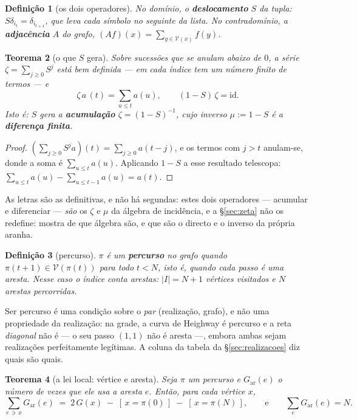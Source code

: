 \documentclass[11pt,a4paper]{article}
\newcommand{\abs}[1]{\lvert #1\rvert}
\newtheorem{teorema}{Teorema}
\newtheorem{definicao}[teorema]{Definição}
\begin{document}
\begin{definicao}[os dois operadores]\label{def:ops}
No domínio, o \textbf{deslocamento} $S$ da tupla: $S\delta_{i_t}=\delta_{i_{t+1}}$,
que leva cada símbolo no seguinte da lista. No contradomínio, a
\textbf{adjacência} $A$ do grafo, $(Af)(x)=\sum_{y\in \mathcal{V}(x)}f(y)$.
\end{definicao}

\begin{teorema}[o que $S$ gera]\label{thm:shift}
Sobre sucessões que se anulam abaixo de $0$, a série
$\zeta=\sum_{j\ge0}S^{j}$ está bem definida --- em cada índice tem um número
finito de termos --- e
\[
\zeta\,a\,(t)=\sum_{u\le t}a(u),\qquad (1-S)\,\zeta=\mathrm{id}.
\]
Isto é: $S$ gera a \textbf{acumulação} $\zeta=(1-S)^{-1}$, cujo inverso
$\mu:=1-S$ é a \textbf{diferença finita}.
\end{teorema}

\begin{proof}
$(\sum_{j\ge0}S^j a)(t)=\sum_{j\ge0}a(t-j)$, e os termos com $j>t$ anulam-se,
donde a soma é $\sum_{u\le t}a(u)$. Aplicando $1-S$ a esse resultado telescopa:
$\sum_{u\le t}a(u)-\sum_{u\le t-1}a(u)=a(t)$.
\end{proof}

\medskip\noindent As letras são as definitivas, e não há segundas: estes dois
operadores --- acumular e diferenciar --- \emph{são} os $\zeta$ e $\mu$ da
álgebra de incidência, e a §\ref{sec:zeta} não os redefine: mostra de que
álgebra são, e que são o directo e o inverso da própria aranha.

\begin{definicao}[percurso]\label{def:percurso}
$\pi$ é um \textbf{percurso} no grafo quando $\pi(t+1)\in \mathcal{V}(\pi(t))$ para todo
$t<N$, isto é, quando cada passo é uma \emph{aresta}. Nesse caso o índice conta
arestas: $\abs{I}=N+1$ vértices visitados e $N$ arestas percorridas.
\end{definicao}

\medskip\noindent Ser percurso é uma condição sobre o \emph{par}
(realização, grafo), e não uma propriedade da realização: na grade, a curva de
Heighway é percurso e a reta \emph{diagonal} não é --- o seu passo $(1,1)$ não é
aresta ---, embora ambas sejam realizações perfeitamente legítimas. A coluna da
tabela da §\ref{sec:realizacoes} diz quais são quais.

\begin{teorema}[a lei local: vértice e aresta]\label{thm:handshake}
Seja $\pi$ um percurso e $G_{\mathrm{ar}}(e)$ o número de vezes que ele usa a
aresta $e$. Então, para cada vértice $x$,
\[
\sum_{e\,\ni\,x}G_{\mathrm{ar}}(e)\;=\;2\,G(x)\;-\;[\,x=\pi(0)\,]\;-\;[\,x=\pi(N)\,],
\qquad\text{e}\qquad \sum_{e}G_{\mathrm{ar}}(e)=N .
\]
\end{teorema}
\end{document}
